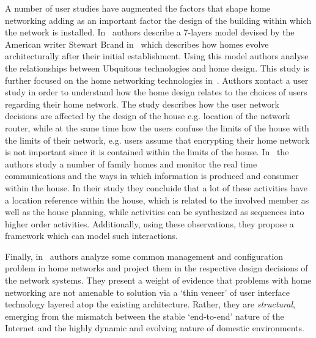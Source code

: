 A number of user studies have augmented the factors that shape home networking
adding as an important factor the design of the building within which the
network is installed. In~\cite{Rodden2003} authors describe a 7-layers model
devised by the American writer Stewart Brand in~\cite{Brand:1994} which
describes how homes evolve architecturally after their initial establishment.
Using this model authors analyse the relationships between Ubquitous
technologies and home design. This study is further focused on the home
networking technologies in~\cite{chetty07:_how_smart_homes_learn}. Authors
xontact a user study in order to understand how the home design relates to the
choices of users regarding their home network. The study describes how the user
network decisions are affected by the design of the house e.g. location of the
network router, while at the same time how the users confuse the limits of the
house with the limits of their network, e.g. users assume that encrypting their
home network is not important since it is contained within the limits of the
house.  In~\cite{rodden04:_between,crabtree03:_findin_place_ubicom_home} the
authors study a number of family homes and monitor the real time communications
and the ways in which information is produced and consumer within the house. In
their study they concluide that a lot of these activities have a location
reference within the house, which is related to the involved member as well as
the house planning, while activities can be synthesized as sequences into higher
order activities. Additionally, using these observations, they propose a
framework which can model such interactions. 

Finally, in~\cite{shehan07:_home_networ_hci} authors analyze some common
management and configuration problem in home networks and project them in the
respective design decisions of the network systems.  They present a weight of
evidence that problems with home networking are not amenable to solution via a
`thin veneer' of user interface technology layered atop the existing
architecture.  Rather, they are \emph{structural}, emerging from the mismatch
between the stable `end-to-end' nature of the Internet and the highly dynamic
and evolving nature of domestic environments.  




